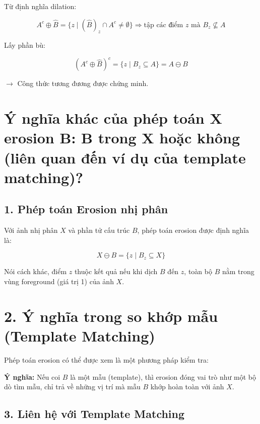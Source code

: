 \documentclass[12pt]{article}
\begin{document}
	Từ định nghĩa dilation:
	
	\[
	A^c \oplus \hat{B} = \{ z \mid (\hat{B})_z \cap A^c \neq \emptyset \}
	\Rightarrow \text{tập các điểm } z \text{ mà } B_z \not\subseteq A
	\]
	
	Lấy phần bù:
	
	\[
	\left( A^c \oplus \hat{B} \right)^c = \{ z \mid B_z \subseteq A \} = A \ominus B
	\]
	
	 $\rightarrow$ Công thức tương đương được chứng minh.
	 
	 \section{Ý nghĩa khác của phép toán X erosion B: B trong X hoặc không (liên quan đến ví dụ của template matching)?}
	 
	 \subsection*{1. Phép toán Erosion nhị phân}
	 
	 Với ảnh nhị phân $X$ và phần tử cấu trúc $B$, phép toán erosion được định nghĩa là:
	 
	 \[
	 X \ominus B = \{ z \mid B_z \subseteq X \}
	 \]
	 
	 Nói cách khác, điểm $z$ thuộc kết quả nếu khi dịch $B$ đến $z$, toàn bộ $B$ nằm trong vùng foreground (giá trị 1) của ảnh $X$.
	 
	 \section*{2. Ý nghĩa trong so khớp mẫu (Template Matching)}
	 
	 Phép toán erosion có thể được xem là một phương pháp kiểm tra:
	 
	 \begin{center}
	 \end{center}
	 
	 \textbf{Ý nghĩa:} Nếu coi $B$ là một mẫu (template), thì erosion đóng vai trò như một bộ dò tìm mẫu, chỉ trả về những vị trí mà mẫu $B$ khớp hoàn toàn với ảnh $X$.
	 
	 \subsection*{3. Liên hệ với Template Matching}
	 
\end{document}
